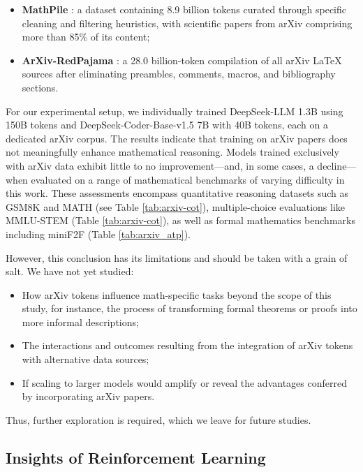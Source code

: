\begin{itemize}[topsep=0pt]
    \item \textbf{MathPile} \citep{mathpile}: a dataset containing 8.9 billion tokens curated through specific cleaning and filtering heuristics, with scientific papers from arXiv comprising more than 85\% of its content;
    \item \textbf{ArXiv-RedPajama} \citep{redpajama}: a 28.0 billion-token compilation of all arXiv LaTeX sources after eliminating preambles, comments, macros, and bibliography sections.
\end{itemize}

For our experimental setup, we individually trained DeepSeek-LLM 1.3B using 150B tokens and DeepSeek-Coder-Base-v1.5 7B with 40B tokens, each on a dedicated arXiv corpus. The results indicate that training on arXiv papers does not meaningfully enhance mathematical reasoning. Models trained exclusively with arXiv data exhibit little to no improvement—and, in some cases, a decline—when evaluated on a range of mathematical benchmarks of varying difficulty in this work. These assessments encompass quantitative reasoning datasets such as GSM8K and MATH (see Table \ref{tab:arxiv-cot}), multiple-choice evaluations like MMLU-STEM (Table \ref{tab:arxiv-cot}), as well as formal mathematics benchmarks including miniF2F (Table \ref{tab:arxiv_atp}).

However, this conclusion has its limitations and should be taken with a grain of salt. We have not yet studied:

\begin{itemize}[topsep=0pt]
    \item How arXiv tokens influence math-specific tasks beyond the scope of this study, for instance, the process of transforming formal theorems or proofs into more informal descriptions;
    \item The interactions and outcomes resulting from the integration of arXiv tokens with alternative data sources;
    \item If scaling to larger models would amplify or reveal the advantages conferred by incorporating arXiv papers.
\end{itemize}

Thus, further exploration is required, which we leave for future studies.

\subsection{Insights of Reinforcement Learning}
